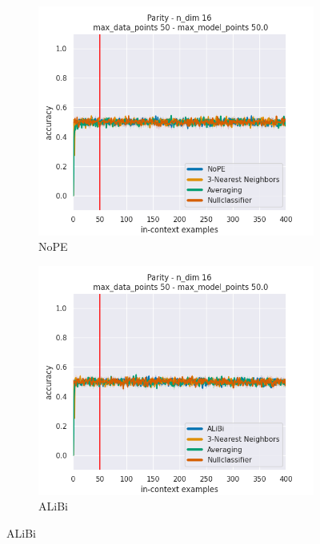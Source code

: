 \documentclass[letterpaper]{article} %
\begin{document}
\begin{figure}[tp]
    \centering
    \begin{subfigure}[t]{0.24\linewidth}
        \includegraphics[width=\linewidth]{AnonymousSubmission/LaTeX/imgs/experiments/parity/nope.png}
        \caption{NoPE}
    \end{subfigure}
    \begin{subfigure}[t]{0.24\linewidth}
        \includegraphics[width=\linewidth]{AnonymousSubmission/LaTeX/imgs/experiments/parity/alibi.png}
        \caption{ALiBi}

\end{subfigure}
\end{figure}
\end{document}
